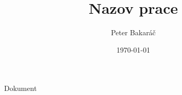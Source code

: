 \documentclass[11pt, a4paper, titlepage, oneside, fleqn]{article}
\author{Peter Bakaráč}
\title{Nazov prace}
\date{\today}
\begin{document}
Dokument
\end{document}
